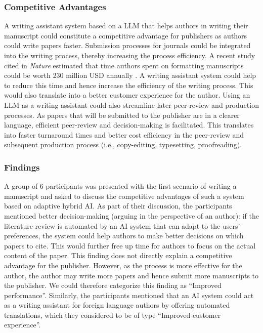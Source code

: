 \subsubsection*{Competitive Advantages} 
A writing assistant system based on a LLM that helps authors in writing their manuscript could constitute a competitive advantage for 
publishers as authors could write papers faster. Submission processes for journals could be integrated into the writing process, thereby
increasing the process efficiency. A recent study cited in \textit{Nature} estimated that time authors spent on formatting manuscripts
could be worth 230 million USD annually \citep{kozlovRevealedMillionsDollars2023,clotworthySavingTimeMoney2023}. A writing assistant
system could help to reduce this time and hence increase the efficiency of the writing process. This would also translate into a better
customer experience for the author. Using an LLM as a writing assistant could also streamline later peer-review and production processes.
As papers that will be submitted to the  publisher are in a clearer language, efficient peer-review and decision-making is facilitated.
This translates into faster turnaround times and better cost efficiency in the peer-review and subsequent production process (i.e.,
copy-editing, typesetting, proofreading).

\subsubsection*{Findings}
A group of 6 participants was presented with the first scenario of writing a manuscript and asked to discuss the competitive 
advantages of such a system based on adaptive hybrid AI. As part of their discussion, the participants mentioned better decision-making
(arguing in the perspective of an author): if the literature review is automated by an AI system that can adapt to the users' preferences, 
the system could help authors to make better decisions on which papers to cite. This would further free up time for authors
to focus on the actual content of the paper. This finding does not directly explain a competitive advantage for the
publisher. However, as the process is more effective for the author, the author may write more papers and hence submit 
more manuscripts to the publisher. We could therefore categorize this finding as ``Improved performance''. Similarly, the participants
mentioned that an AI system could act as a writing assistant for foreign language authors by offering automated translations, which 
they considered to be of type ``Improved customer experience''.



